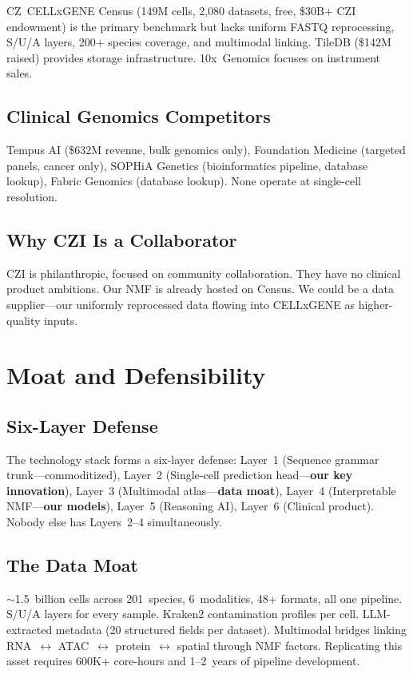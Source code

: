 \documentclass[10pt,twocolumn,letterpaper]{article}
\begin{document}
CZ~CELLxGENE Census (149M cells, 2,080 datasets, free, \$30B+ CZI endowment)
is the primary benchmark but lacks uniform FASTQ reprocessing, S/U/A layers,
200+ species coverage, and multimodal linking. TileDB (\$142M raised) provides
storage infrastructure. 10x~Genomics focuses on instrument sales.

\subsection{Clinical Genomics Competitors}

Tempus AI (\$632M revenue, bulk genomics only), Foundation Medicine (targeted
panels, cancer only), SOPHiA Genetics (bioinformatics pipeline, database lookup),
Fabric Genomics (database lookup). None operate at single-cell resolution.

\subsection{Why CZI Is a Collaborator}

CZI is philanthropic, focused on community collaboration. They have no clinical
product ambitions. Our NMF is already hosted on Census. We could be a data
supplier---our uniformly reprocessed data flowing into CELLxGENE as higher-quality
inputs.

\section{Moat and Defensibility}
\label{sec:moat}

\subsection{Six-Layer Defense}

The technology stack forms a six-layer defense:
Layer~1 (Sequence grammar trunk---commoditized),
Layer~2 (Single-cell prediction head---\textbf{our key innovation}),
Layer~3 (Multimodal atlas---\textbf{data moat}),
Layer~4 (Interpretable NMF---\textbf{our models}),
Layer~5 (Reasoning AI),
Layer~6 (Clinical product).
Nobody else has Layers~2--4 simultaneously.

\subsection{The Data Moat}

$\sim$1.5~billion cells across 201~species, 6~modalities, 48+ formats, all one
pipeline. S/U/A layers for every sample. Kraken2 contamination profiles per cell.
LLM-extracted metadata (20 structured fields per dataset). Multimodal bridges
linking RNA~$\leftrightarrow$ ATAC~$\leftrightarrow$ protein~$\leftrightarrow$
spatial through NMF factors. Replicating this asset requires 600K+ core-hours
and 1--2~years of pipeline development.
\end{document}
